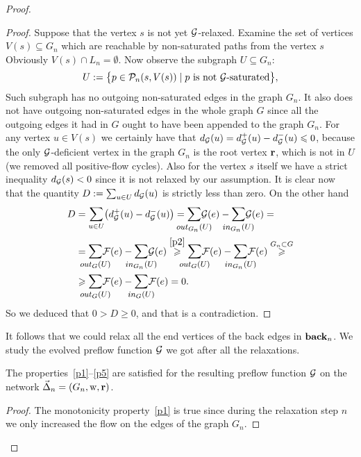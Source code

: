 \documentclass[12pt]{article}
\begin{document}
\begin{proof}
\begin{proof}
        Suppose that the vertex $s$ is not yet $\cal{G}$-relaxed.
        Examine the set of vertices $V(s) \subseteq G_n$ which are reachable by non-saturated paths from the vertex $s$
        Obviously $V(s) \cap L_n = \emptyset$.
        Now observe the subgraph $U \subseteq G_n$:
        \[
          U := \big\{p \in \gnpaths(s, V(s)) \mid \text{$p$ is not $\cal{G}$-saturated}\big\},
        \]
        Such subgraph has no outgoing non-saturated edges in the graph $G_n$.
        It also does not have outgoing non-saturated edges in the whole graph $G$ since all the outgoing edges it had in $G$
          ought to have been appended to the graph $G_n$.
        For any vertex $u \in V(s)$ we certainly have that $d_{\cal{G}}(u) = d^{+}_{\cal{G}}(u) - d^{-}_{\cal{G}}(u) \leq 0$, because
          the only $\cal{G}$-deficient vertex in the graph $G_n$ is the root vertex $\root$, which is not in $U$ (we removed all positive-flow
          cycles).
        Also for the vertex $s$ itself we have a strict inequality $d_{\cal{G}}(s) < 0$ since it is not relaxed by our assumption.
        It is clear now that the quantity $D := \sum_{u \in U} d_{\cal{G}}(u)$ is strictly less than zero.
        On the other hand
        \[
        \begin{split}
          D &= \mathlarger\sum_{u \in U} \big(d^{+}_{\cal{G}}(u) - d^{-}_{\cal{G}}(u)\big)
          = \mathlarger{\smashoperator{\sum_{\eout_{G_n}(U)}}} \cal{G}(e) - \mathlarger{\smashoperator{\sum_{\ein_{G_n}(U)}}} \cal{G}(e) = \\
          &= \mathlarger{\smashoperator{\sum_{\eout_{G}(U)}}} \flowpos(e) - \mathlarger{\smashoperator{\sum_{\ein_{G_n}(U)}}} \cal{G}(e)
            \overset{\ref{p2}}{\geq} \mathlarger{\smashoperator{\sum_{\eout_G(U)}}} \flowpos(e) - \mathlarger{\smashoperator{\sum_{\ein_{G_n}(U)}}} \flowpos(e) 
            \overset{G_n \subset G} \geq \\
          &\geq \mathlarger{\smashoperator{\sum_{\eout_G(U)}}} \flowpos(e) - \mathlarger{\smashoperator{\sum_{\ein_{G}(U)}}} \flowpos(e) = 0.
        \end{split}
      \]
        So we deduced that $0 > D \geq 0$, and that is a contradiction.
      \end{proof}
      It follows that we could relax all the end vertices of the back edges in $\eback_n$.
      We study the evolved preflow function $\cal{G}$ we got after all the relaxations.
      \begin{prop}
        The properties~\ref{p1}--\ref{p5} are satisfied for the resulting preflow function $\cal{G}$ on the network $\onet_n = (G_n, \wtp, \root)$.
      \end{prop}
      \begin{proof}
        The monotonicity property~\ref{p1} is true since during the relaxation step $n$ we
          only increased the flow on the edges of the graph $G_n$.


\end{proof}
\end{proof}
\end{document}
